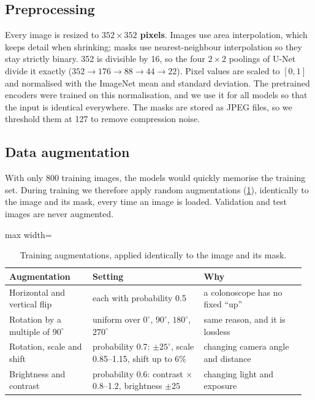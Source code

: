 \subsection{Preprocessing}
\label{sec:preproc}
Every image is resized to \textbf{$352\times352$ pixels}. Images use area interpolation, which keeps detail when
shrinking; masks use nearest-neighbour interpolation so they stay strictly binary. 352 is divisible by 16,
so the four $2\times2$ poolings of U-Net divide it exactly ($352 \rightarrow 176 \rightarrow 88 \rightarrow 44 \rightarrow 22$). Pixel values are scaled to
$[0, 1]$ and normalised with the ImageNet mean and standard deviation. The pretrained encoders were trained on
this normalisation, and we use it for all models so that the input is identical everywhere. The masks are
stored as JPEG files, so we threshold them at 127 to remove compression noise.

\subsection{Data augmentation}
\label{sec:augment}
With only 800 training images, the models would quickly memorise the training set. During training we
therefore apply random augmentations (\cref{tab:augment}), identically to the image and its mask, every time an image is loaded.
Validation and test images are never augmented.

\begin{table}[t]
  \centering
  \small
  \setlength{\tabcolsep}{3pt}
  \begin{adjustbox}{max width=\linewidth}
  \begin{tabular}{@{}p{0.27\linewidth}p{0.36\linewidth}p{0.33\linewidth}@{}}
    \toprule
    Augmentation & Setting & Why \\
    \midrule
    Horizontal and vertical flip & each with probability 0.5 & a colonoscope has no fixed ``up'' \\
    Rotation by a multiple of $90^\circ$ & uniform over $0^\circ$, $90^\circ$, $180^\circ$, $270^\circ$ & same reason, and it is lossless \\
    Rotation, scale and shift & probability 0.7: $\pm25^\circ$, scale 0.85--1.15, shift up to 6\% & changing camera angle and distance \\
    Brightness and contrast & probability 0.6: contrast $\times$0.8--1.2, brightness $\pm25$ & changing light and exposure \\
    \bottomrule
  \end{tabular}
  \end{adjustbox}
  \caption{Training augmentations, applied identically to the image and its mask.}
  \label{tab:augment}
\end{table}

